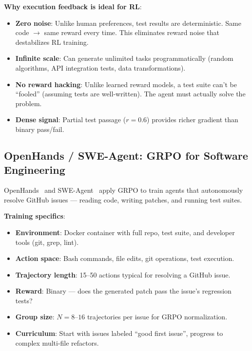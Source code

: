 \textbf{Why execution feedback is ideal for RL}:

\begin{itemize}
  \item \textbf{Zero noise}: Unlike human preferences, test results are deterministic. Same code $\rightarrow$ same reward every time. This eliminates reward noise that destabilizes RL training.
  \item \textbf{Infinite scale}: Can generate unlimited tasks programmatically (random algorithms, API integration tests, data transformations).
  \item \textbf{No reward hacking}: Unlike learned reward models, a test suite can’t be ``fooled'' (assuming tests are well-written). The agent must actually solve the problem.
  \item \textbf{Dense signal}: Partial test passage ($r = 0.6$) provides richer gradient than binary pass/fail.
\end{itemize}

\subsection{OpenHands / SWE-Agent: GRPO for Software Engineering}
\label{openhands-swe-agent-grpo-for-software-engineering}

OpenHands~\cite{wang2024openhands} and SWE-Agent~\cite{yang2024sweagent} apply GRPO to train agents that autonomously resolve GitHub issues --- reading code, writing patches, and running test suites.

\textbf{Training specifics}:

\begin{itemize}
  \item \textbf{Environment}: Docker container with full repo, test suite, and developer tools (git, grep, lint).
  \item \textbf{Action space}: Bash commands, file edits, git operations, test execution.
  \item \textbf{Trajectory length}: 15--50 actions typical for resolving a GitHub issue.
  \item \textbf{Reward}: Binary --- does the generated patch pass the issue’s regression tests?
  \item \textbf{Group size}: $N = 8$--$16$ trajectories per issue for GRPO normalization.
  \item \textbf{Curriculum}: Start with issues labeled ``good first issue'', progress to complex multi-file refactors.
\end{itemize}

